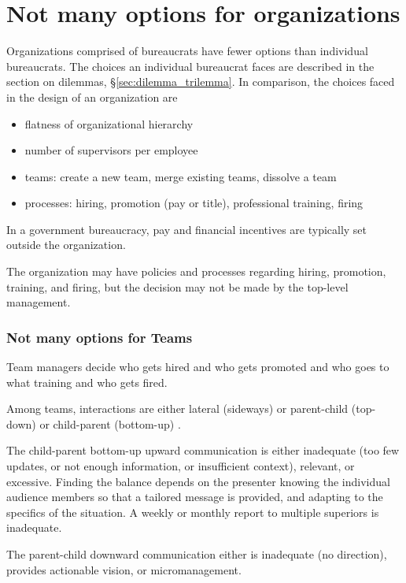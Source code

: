 \section{Not many options for organizations}

Organizations comprised of bureaucrats have fewer options than individual bureaucrats. The choices an individual bureaucrat faces are described in the section on dilemmas, \S\ref{sec:dilemma_trilemma}. In comparison, the choices faced in the design of an organization are
\begin{itemize}
    \item flatness of organizational hierarchy
    \item number of supervisors per employee
    \item teams: create a new team, merge existing teams, dissolve a team
    \item processes: hiring, promotion (pay or title), professional training, firing
\end{itemize}
In a government bureaucracy, pay and financial incentives are typically set outside the organization.

The organization may have policies and processes regarding hiring, promotion, training, and firing, but the decision may not be made by the top-level management. 

\subsubsection{Not many options for Teams}

Team managers decide who gets hired and who gets promoted and who goes to what training and who gets fired.

Among teams, interactions are either lateral (sideways) or parent-child (top-down) or child-parent (bottom-up) \cite{2014_Jorgensen}.

The child-parent bottom-up upward communication is either inadequate (too few updates, or not enough information, or insufficient context), relevant, or excessive. Finding the balance depends on the presenter knowing the individual audience members so that a tailored message is provided, and adapting to the specifics of the situation. A weekly or monthly report to multiple superiors is inadequate. 

The parent-child downward communication either is inadequate (no direction), provides actionable vision, or micromanagement. 

